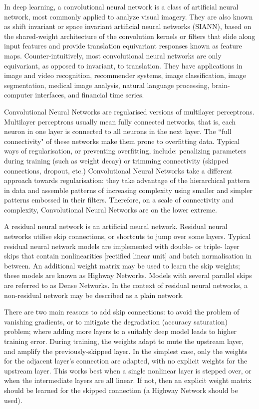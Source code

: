 In deep learning, a convolutional neural network is a class of artificial neural network, most commonly applied to analyze visual imagery. They are also known as shift invariant or space invariant artificial neural networks (SIANN), based on the shared-weight architecture of the convolution kernels or filters that slide along input features and provide translation equivariant responses known as feature maps. Counter-intuitively, most convolutional neural networks are only equivariant, as opposed to invariant, to translation. They have applications in image and video recognition, recommender systems, image classification, image segmentation, medical image analysis, natural language processing, brain-computer interfaces, and financial time series.

Convolutional Neural Networks are regularised versions of multilayer perceptrons. Multilayer perceptrons usually mean fully connected networks, that is, each neuron in one layer is connected to all neurons in the next layer. The ``full connectivity" of these networks make them prone to overfitting data. Typical ways of regularisation, or preventing overfitting, include: penalizing parameters during training (such as weight decay) or trimming connectivity (skipped connections, dropout, etc.) Convolutional Neural Networks take a different approach towards regularisation: they take advantage of the hierarchical pattern in data and assemble patterns of increasing complexity using smaller and simpler patterns embossed in their filters. Therefore, on a scale of connectivity and complexity, Convolutional Neural Networks are on the lower extreme.

A residual neural network is an artificial neural network. Residual neural networks utilise skip connections, or shortcuts to jump over some layers. Typical residual neural network models are implemented with double- or triple- layer skips that contain nonlinearities [rectified linear unit] and batch normalisation in between. An additional weight matrix may be used to learn the skip weights; these models are known as Highway Networks. Models with several parallel skips are referred to as Dense Networks. In the context of residual neural networks, a non-residual network may be described as a plain network.

There are two main reasons to add skip connections: to avoid the problem of vanishing gradients, or to mitigate the degradation (accuracy saturation) problem; where adding more layers to a suitably deep model leads to higher training error. During training, the weights adapt to mute the upstream layer, and amplify the previously-skipped layer. In the simplest case, only the weights for the adjacent layer's connection are adapted, with no explicit weights for the upstream layer. This works best when a single nonlinear layer is stepped over, or when the intermediate layers are all linear. If not, then an explicit weight matrix should be learned for the skipped connection (a Highway Network should be used).

